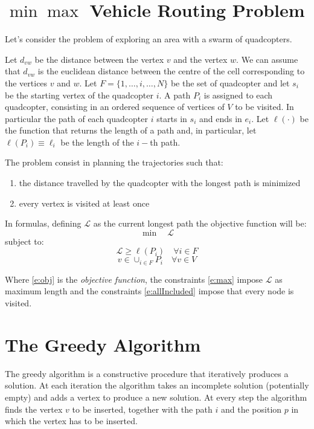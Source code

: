 \section{$\min \max$ Vehicle Routing Problem}
\label{s:vrp}

Let's consider the problem of exploring an area with a swarm of quadcopters.


Let $d_{vw}$ be the distance between the vertex $v$ and the vertex $w$.
We can assume that $d_{vw}$ is the euclidean distance between the centre of the cell corresponding to the vertices  $v$ and $w$.
Let $F = \{ 1, \ldots, i, \ldots, N\}$ be the set of quadcopter and let $s_i$ be the starting vertex  of the quadcopter $i$.
A path $P_i$ is assigned to each quadcopter, consisting in an ordered sequence of vertices of $V$ to be visited.
In particular the path of each quadcopter $i$ starts in $s_i$ and ends in $e_i$.
Let $\ell(\cdot)$ be the function that returns the length of a path and, in particular, let $\ell(P_i) \equiv \ell_i$ be the length of the $i-$th path.

\noindent The problem consist in planning the trajectories such that:

\begin{enumerate}[label=\textbf{\arabic*.}]
\item the distance travelled by  the quadcopter with the longest path is minimized

\item every vertex is visited at least once
\end{enumerate}

\noindent In formulas, defining $\mathcal{L}$ as the current longest path the objective function will be:
\begin{equation}
\min \quad \mathcal{L} \label{e:obj}
\end{equation}
subject to:
\begin{equation}
\mathcal{L} \geq \ell(P_i) \quad \forall i \in F \label{e:max}
\end{equation}
\begin{equation}
v \in \cup_{i \in F} P_i \quad \forall v \in V \label{e:allIncluded}
\end{equation}


Where \eqref{e:obj} is the \textit{objective function},
the constraints \eqref{e:max} impose $\mathcal{L}$ as maximum length and
the constraints \eqref{e:allIncluded} impose that every node is visited.

\section{The Greedy Algorithm}
\label{s:greedy}
The greedy algorithm is a constructive procedure that iteratively produces a solution.
At each iteration the algorithm takes an incomplete solution (potentially empty) and adds a vertex to produce a new solution.
At every step the algorithm finds the vertex $v$ to be inserted, together with the path $i$ and the position $p$ in which the vertex has to be inserted.

